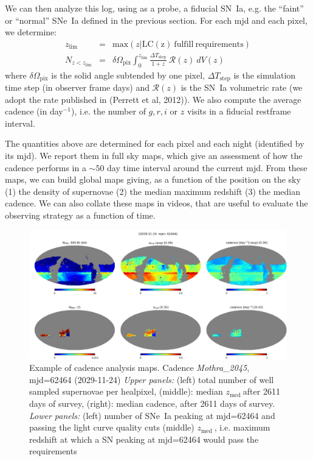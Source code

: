 \documentclass [11pt,a4paper]{article}
\newcommand{\zmed}{$z_{\mathrm{med}}\ $}
\begin{document}
We can then analyze this log, using as a probe, a fiducial SN~Ia,
e.g. the ``faint'' or ``normal'' SNe~Ia defined in the previous
section. For each mjd and each pixel, we determine:
\begin{eqnarray}
  z_{\mathrm{lim}} & = & \mathrm{max}\left(z | \mathrm{LC(z)\ fulfill\ requirements}\right) \\
  N_{z<z_{\mathrm{lim}}} &= & \delta\Omega_{\mathrm{pix}} \int_0^{z_\mathrm{lim}} \frac{\Delta T_{\mathrm{step}}}{1+z}\ {\mathcal{R}}(z)\ dV(z)
\end{eqnarray}
where $\delta\Omega_{\mathrm{pix}}$ is the solid angle subtended by
one pixel, $\Delta T_{\mathrm{step}}$ is the simulation time step (in
observer frame days) and $\mathcal{R}(z)$ is the SN~Ia volumetric rate
(we adopt the rate published in (Perrett et al, 2012)).  We also
compute the average cadence (in day$^{-1}$), i.e. the number of $g, r,
i$ or $z$ visits in a fiducial restframe interval.

The quantities above are determined for each pixel and each night
(identified by its mjd).  We report them in full sky maps, which give
an assessment of how the cadence performs in a $\sim 50$ day time
interval around the current mjd. From these maps, we can build global
maps giving, as a function of the position on the sky (1) the density
of supernovae (2) the median maximum redshift (3) the median cadence.
We can also collate these maps in videos, that are useful to evaluate
the observing strategy as a function of time.

\begin{figure}
    \begin{center}
      \includegraphics[width=\linewidth]{Figures/mothra_2045_02611.png}
      \caption{Example of cadence analysis maps.  Cadence {\em
          Mothra\_2045}, mjd=62464 (2029-11-24) {\em Upper panels:}
        (left) total number of well sampled supernovae per healpixel,
        (middle): median \zmed after 2611 days of survey, (right):
        median cadence, after 2611 days of survey. {\em Lower panels:}
        (left) number of SNe~Ia peaking at mjd=62464 and passing the
        light curve quality cuts (middle) \zmed, i.e.  maximum
        redshift at which a SN peaking at mjd=62464 would pass the
        requirements}
    \end{center}
\end{figure}
\end{document}
